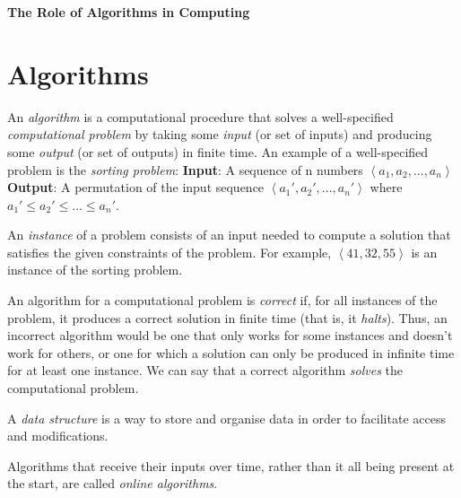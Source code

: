 \documentclass[12pt]{article}
\begin{document}
\begin{center}\LARGE\bf
    The Role of Algorithms in Computing
\end{center}

\section{Algorithms}
An \textit{algorithm} is a computational procedure that solves a well-specified \textit{computational problem} by taking some \textit{input} (or set
of inputs) and producing some \textit{output} (or set of outputs) in finite time. An example of a well-specified problem is the \textit{sorting
problem}:
\newline\textbf{Input}: A sequence of n numbers $\left\langle a_1, a_2, ..., a_n\right\rangle$
\newline\textbf{Output}: A permutation of the input sequence $\left\langle a_1', a_2', ..., a_n' \right\rangle$ where $a_1' \leq  a_2' \leq ... \leq a_n'$.

An \textit{instance} of a problem consists of an input needed to compute a solution that satisfies the given constraints of the problem. For example,
$\left\langle 41, 32, 55 \right\rangle$ is an instance of the sorting problem.

An algorithm for a computational problem is \textit{correct} if, for all instances of the problem, it produces a correct solution in finite time (that is, it \textit{halts}). Thus,
an incorrect algorithm would be one that only works for some instances and doesn't work for others, or one for which a solution can only be produced in
infinite time for at least one instance. We can say that a correct algorithm \textit{solves} the computational problem.

A \textit{data structure} is a way to store and organise data in order to facilitate access and modifications.

Algorithms that receive their inputs over time, rather than it all being present at the start, are called \textit{online algorithms}.
\end{document}
